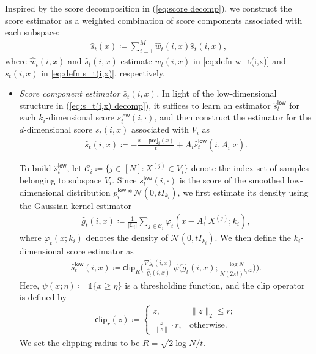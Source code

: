 \documentclass{article}
\newcommand{\ind}{\mathds{1}}
\newcommand{\defn}{\coloneqq}
\newcommand{\cC}{\mathcal{C}}
\newcommand{\clip}{\mathsf{clip}}
\newcommand{\proj}{\mathsf{proj}}
\newcommand{\low}{\mathsf{low}}
\theoremstyle{plain}
\theoremstyle{remark}
\begin{document}
Inspired by the score decomposition in (\ref{eq:score decomp}), we construct the score estimator as a weighted combination of score components associated with each subspace:
\begin{align}
    \widehat{s}_t(x) \defn  \sum_{i=1}^M \widehat{w}_t(i,x) \widehat{s}_t(i,x) \label{eq:score estimator},
\end{align}
where $\widehat{w}_t(i,x)$ and $\widehat{s}_t(i,x)$ estimate $w_t(i,x)$ in \eqref{eq:defn w_t(i,x)} and $s_t(i,x)$ in \eqref{eq:defn s_t(i,x)}, respectively. 
\begin{itemize}
    

\item \textit{Score component estimator $\widehat{s}_t(i,x)$.}
In light of the low-dimensional structure in (\ref{eq:s_t(i,x) decomp}), it suffices to learn an estimator $\widehat{s}_t^\low$ for each $k_i$-dimensional score $s_t^\low(i,\cdot)$, and then construct the estimator for the $d$-dimensional score $s_t(i,x)$ associated with $V_i$ as
\begin{align}
    \widehat{s}_t(i,x) \defn -\frac{x-\proj_i(x)}{t} + A_i \widehat{s}_t^\low(i,A_i^{\top}x).
    \label{eq:s_hat_t(i,x) decomp}
\end{align}

To build $\widehat{s}_t^\low$, let $\cC_i \defn \{j\in [N]: X^{(j)} \in V_i \}$ denote the index set of samples belonging to subspace $V_i$. 
Since $s_t^\low(i,\cdot)$ is the score  of the smoothed low-dimensional distribution $p_i^\low\ast\mathcal{N}(0,tI_{k_i})$,   
we first estimate its density using the Gaussian kernel estimator
\begin{align}
    \widehat{g}_t(i,x) \defn \frac{1}{|\cC_i|} \sum_{j\in \cC_i} \varphi_{t}(x - A_i^{\top} X^{(j)};k_i) \label{eq:estimator for p_t^l(i,x)},
\end{align}
where $\varphi_{t}(x;k_i)$ denotes the density of $\mathcal{N}(0,tI_{k_i})$. 
We then define the $k_i$-dimensional score estimator as
\begin{align}
    \widehat{s}_t^\low(i,x) \defn \clip_{R} \bigg( \frac{\nabla \widehat{g}_t(i,x)}{\widehat{g}_t(i,x)} \psi \Big(\widehat{g}_t(i,x);\frac{\log N}{N(2\pi t)^{k_i/2}}\Big)\bigg). \label{eq:low-dimensional score estimator}
\end{align}
Here, $\psi(x;\eta) \defn \ind\{x \geq \eta\}$ is a thresholding function, and the clip operator is defined by
\begin{align*}
\clip_r(z)\defn  
\begin{cases}
    z, &\|z\|_2 \leq  r; \\
    \frac{z}{\|z\|}\cdot r,&\text{otherwise}.
\end{cases}
\end{align*}
We set the clipping radius to be $R = \sqrt{2\log N/t}$.


\end{itemize}
\end{document}
